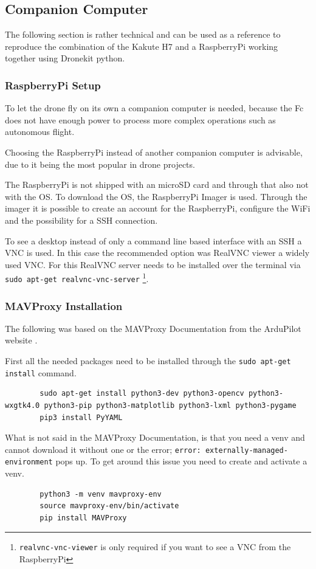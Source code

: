 \documentclass[svgnames]{article}
\begin{document}
	\subsection{Companion Computer}\label{companion computer}
	The following section is rather technical and can be used as a reference to reproduce the combination of the Kakute H7 and a RaspberryPi working together using Dronekit python.
	\subsubsection{RaspberryPi Setup}
	
	To let the drone fly on its own a companion computer is needed, because the \gls{Fc} does not have enough power to process more complex operations such as autonomous flight.
	
	Choosing the RaspberryPi instead of another companion computer is advisable, due to it being the most popular in drone projects.
	
	The RaspberryPi is not shipped with an microSD card and through that also not with the \gls{OS}. To download the \gls{OS}, the RaspberryPi Imager is used. Through the imager it is possible to create an account for the RaspberryPi,  configure the WiFi and the possibility for a \gls{SSH} connection. 

	
	To see a desktop instead of only a command line based interface with an \gls{SSH} a \gls{VNC} is used. In this case the recommended option was RealVNC viewer a widely used \gls{VNC}. For this RealVNC server needs to be installed over the terminal via \lstinline|sudo apt-get realvnc-vnc-server| \cite{ionisvnctutorial}\footnote{\lstinline|realvnc-vnc-viewer| is only required if you want to see a VNC from the RaspberryPi}.
	
	\subsubsection{MAVProxy Installation}
	The following was based on the MAVProxy Documentation from the ArduPilot website  \cite{MavProxydocs}.
	
	First all the needed packages need to be installed through the \lstinline|sudo apt-get install| command. 
	\begin{lstlisting}
		sudo apt-get install python3-dev python3-opencv python3-wxgtk4.0 python3-pip python3-matplotlib python3-lxml python3-pygame
		pip3 install PyYAML
	\end{lstlisting}

	What is not said in the MAVProxy Documentation, is that you need a \gls{venv} and cannot download it without one or the error; \lstinline|error: externally-managed-environment| pops up. To get around this issue you need to create and activate a \gls{venv}.
	\begin{lstlisting}
		python3 -m venv mavproxy-env
		source mavproxy-env/bin/activate
		pip install MAVProxy
	\end{lstlisting} 
	
\end{document}
